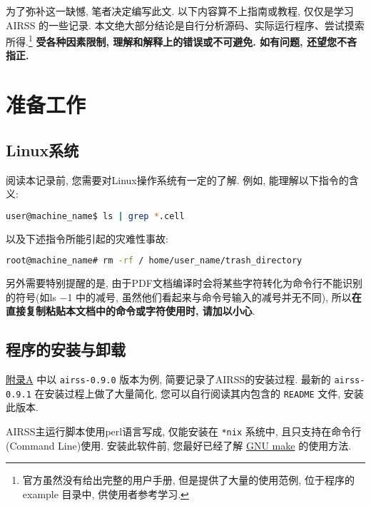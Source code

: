 \documentclass[a4paper, 10pt]{article}
\begin{document}
为了弥补这一缺憾, 笔者决定编写此文. 以下内容算不上指南或教程, 仅仅是学习 AIRSS 的一些记录. 本文绝大部分结论是自行分析源码、实际运行程序、尝试摸索所得.\footnote{官方虽然没有给出完整的用户手册, 但是提供了大量的使用范例, 位于程序的 example 目录中, 供使用者参考学习.} \textbf{受各种因素限制, 理解和解释上的错误或不可避免. 如有问题, 还望您不吝指正.}


\newpage
\section{准备工作}
\subsection{Linux系统} 
阅读本记录前, 您需要对Linux操作系统有一定的了解. 例如, 能理解以下指令的含义:
\begin{lstlisting}[language={bash}]
user@machine_name$ ls | grep *.cell
\end{lstlisting}

以及下述指令所能引起的灾难性事故:
\begin{lstlisting}[language={bash}]
root@machine_name# rm -rf / home/user_name/trash_directory
\end{lstlisting}

另外需要特别提醒的是, 由于PDF文档编译时会将某些字符转化为命令行不能识别的符号(如ls \(-\)1 中的减号, 虽然他们看起来与命令号输入的减号并无不同), 所以\textbf{在直接复制粘贴本文档中的命令或字符使用时, 请加以小心}.

\subsection{程序的安装与卸载}
\hyperref[sec:airss-install]{附录A} 中以 \verb|airss-0.9.0| 版本为例, 简要记录了AIRSS的安装过程. 最新的 \verb|airss-0.9.1| 在安装过程上做了大量简化, 您可以自行阅读其内包含的 \verb|README| 文件, 安装此版本.

AIRSS主运行脚本使用perl语言写成, 仅能安装在 \verb|*nix| 系统中, 且只支持在命令行(Command Line)使用. 安装此软件前, 您最好已经了解 \href{https://www.gnu.org/software/make/manual/}{GNU make} 的使用方法.
\end{document}
